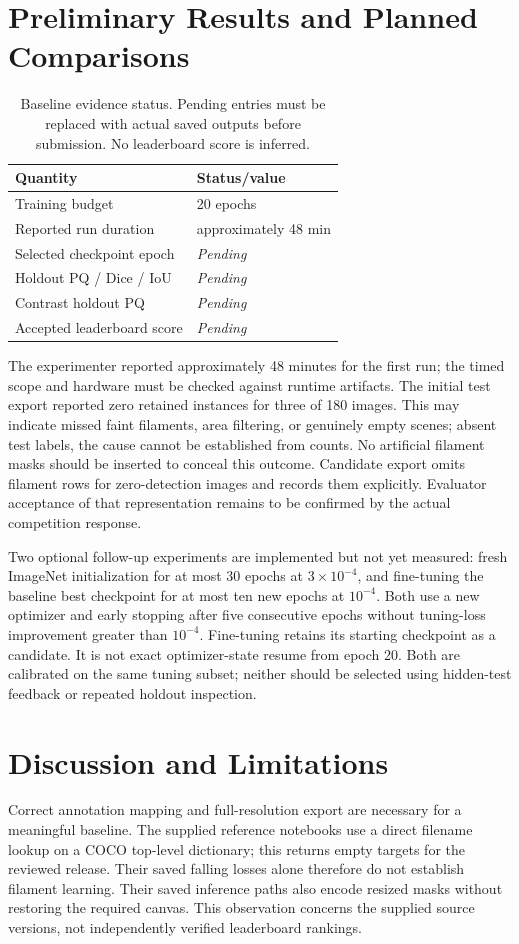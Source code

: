 \documentclass[conference]{IEEEtran}
\newcommand{\pending}{\textit{Pending}}
\begin{document}
\section{Preliminary Results and Planned Comparisons}
\begin{table}[t]
\centering
\caption{Baseline evidence status. Pending entries must be replaced with
actual saved outputs before submission. No leaderboard score is inferred.}
\begin{tabular}{ll}
\toprule
Quantity & Status/value\\
\midrule
Training budget & 20 epochs\\
Reported run duration & approximately 48 min\\
Selected checkpoint epoch & \pending\\
Holdout PQ / Dice / IoU & \pending\\
Contrast holdout PQ & \pending\\
Accepted leaderboard score & \pending\\
\bottomrule
\end{tabular}
\end{table}
The experimenter reported approximately 48 minutes for the first run; the
timed scope and hardware must be checked against runtime artifacts.
The initial test export reported zero retained instances for three of 180
images. This may indicate missed faint filaments, area filtering, or genuinely
empty scenes; absent test labels, the cause cannot be established from counts.
No artificial filament masks should be inserted to conceal this outcome.
Candidate export omits filament rows for zero-detection images and records
them explicitly. Evaluator acceptance of that representation remains to be
confirmed by the actual competition response.

Two optional follow-up experiments are implemented but not yet measured:
fresh ImageNet initialization for at most 30 epochs at $3\times10^{-4}$, and
fine-tuning the baseline best checkpoint for at most ten new epochs at
$10^{-4}$. Both use a new optimizer and early stopping after five consecutive
epochs without tuning-loss improvement greater than $10^{-4}$. Fine-tuning
retains its starting checkpoint as a candidate. It is not exact optimizer-state
resume from epoch 20. Both are calibrated on the same tuning subset; neither
should be selected using hidden-test feedback or repeated holdout inspection.

\section{Discussion and Limitations}
Correct annotation mapping and full-resolution export are necessary for a
meaningful baseline. The supplied reference notebooks use a direct filename
lookup on a COCO top-level dictionary; this returns empty targets for the
reviewed release. Their saved falling losses alone therefore do not establish
filament learning. Their saved inference paths also encode resized masks
without restoring the required canvas. This observation concerns the supplied
source versions, not independently verified leaderboard rankings.
\end{document}

